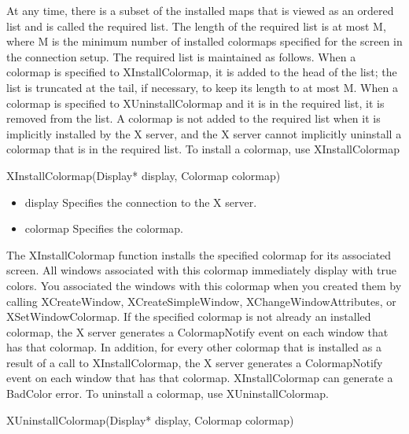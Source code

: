 \documentclass{report}
\begin{document}
\begin{itemize}
            \bigbreak \noindent 
            At any time, there is a subset of the installed maps that is viewed as an ordered list and is called the required list. The length of the required list is at most M, where M is the minimum number of installed colormaps specified for the screen in the connection setup. The required list is maintained as follows. When a colormap is specified to XInstallColormap, it is added to the head of the list; the list is truncated at the tail, if necessary, to keep its length to at most M. When a colormap is specified to XUninstallColormap and it is in the required list, it is removed from the list. A colormap is not added to the required list when it is implicitly installed by the X server, and the X server cannot implicitly uninstall a colormap that is in the required list.
            \bigbreak \noindent 
            To install a colormap, use XInstallColormap
            \bigbreak \noindent 
            \begin{cppcode}
                XInstallColormap(Display* display, Colormap colormap)
            \end{cppcode}
            \bigbreak \noindent
            \begin{itemize}
                \item display Specifies the connection to the X server.
                \item colormap Specifies the colormap.
            \end{itemize}
            The XInstallColormap function installs the specified colormap for its associated screen. All windows associated with this colormap immediately display with true colors. You associated the windows with this colormap when you created them by calling XCreateWindow, XCreateSimpleWindow, XChangeWindowAttributes, or XSetWindowColormap.
            \bigbreak \noindent 
            If the specified colormap is not already an installed colormap, the X server generates a ColormapNotify event on each window that has that colormap. In addition, for every other colormap that is installed as a result of a call to XInstallColormap, the X server generates a ColormapNotify event on each window that has that colormap.
            \bigbreak \noindent 
            XInstallColormap can generate a BadColor error.
            \bigbreak \noindent 
            To uninstall a colormap, use XUninstallColormap.
            \bigbreak \noindent 
            \begin{cppcode}
                XUninstallColormap(Display* display, Colormap colormap)

\end{cppcode}
\end{itemize}
\end{document}
